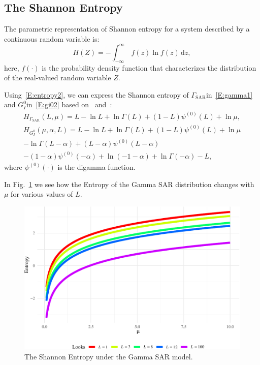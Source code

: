 \documentclass[conference,final,]{IEEEtran}
\begin{document}
\hypertarget{the-shannon-entropy}{%
\subsection{The Shannon Entropy}\label{the-shannon-entropy}}

The parametric representation of Shannon entropy for a system described
by a continuous random variable is: \begin{equation}
  \label{E:entropy2}
  H(Z)=-\int_{-\infty }^\infty \ f(z)\ln f(z)\, \mathrm{d}z,
\end{equation} here, \(f(\cdot)\) is the probability density function
that characterizes the distribution of the real-valued random variable
\(Z\).

Using~\eqref{E:entropy2}, we can express the Shannon entropy of
\(\Gamma_{\text{SAR}}\)in~\eqref{E:gamma1} and
\(G_I^0\)in~\eqref{E:gi02} based on~\cite{Cassetti2022}
and~\cite{Ferreira2020}: \begin{multline}
\label{E:E-gamma}
H_{\Gamma_{\text{SAR}}}(L, \mu) =   L -\ln L+\ln\Gamma(L)+(1-L)\psi^{(0)}(L) + \ln \mu, 
\end{multline} \begin{multline}
\label{E:E-GIO}
H_{G_I^0}(\mu, \alpha, L) =L -\ln L+\ln\Gamma(L)+(1-L)\psi^{(0)}(L) +\ln \mu \\
-\ln\Gamma(L-\alpha)+ (L-\alpha) \psi^{(0)}(L-\alpha)\\
-(1-\alpha)\psi^{(0)}(-\alpha)+\ln (-1-\alpha)+\ln\Gamma(-\alpha)-L,
\end{multline} where \(\psi^{(0)}(\cdot)\) is the digamma function.

In Fig.~\ref{fig:PlotGammaSAR} we see how the Entropy of the Gamma SAR
distribution changes with \(\mu\) for various values of \(L\).

\begin{figure}[hbt]

{\centering \includegraphics[width=1\linewidth]{R1-The-Entropy-as-a-Proxy-for-Fully-Developed-Speckle_files/figure-latex/PlotGammaSAR-1} 

}

\caption{The Shannon Entropy under the Gamma SAR model.}\label{fig:PlotGammaSAR}
\end{figure}
\end{document}
